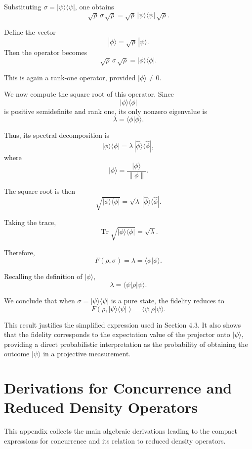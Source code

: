 \documentclass[a4paper]{article}
\begin{document}
Substituting $\sigma = |\psi\rangle\langle\psi|$, one obtains
\[
\sqrt{\rho}\,\sigma\,\sqrt{\rho}
=
\sqrt{\rho}\,|\psi\rangle\langle\psi|\,\sqrt{\rho}.
\]

Define the vector
\[
|\phi\rangle = \sqrt{\rho}\,|\psi\rangle.
\]
Then the operator becomes
\[
\sqrt{\rho}\,\sigma\,\sqrt{\rho}
=
|\phi\rangle\langle\phi|.
\]

This is again a rank-one operator, provided $|\phi\rangle \neq 0$.

\medskip

We now compute the square root of this operator. Since
\[
|\phi\rangle\langle\phi|
\]
is positive semidefinite and rank one, its only nonzero eigenvalue is
\[
\lambda = \langle \phi | \phi \rangle.
\]

Thus, its spectral decomposition is
\[
|\phi\rangle\langle\phi|
=
\lambda\,|\hat{\phi}\rangle\langle\hat{\phi}|,
\]
where
\[
|\hat{\phi}\rangle = \frac{|\phi\rangle}{\|\phi\|}.
\]

The square root is then
\[
\sqrt{|\phi\rangle\langle\phi|}
=
\sqrt{\lambda}\,|\hat{\phi}\rangle\langle\hat{\phi}|.
\]

Taking the trace,
\[
\operatorname{Tr}\sqrt{|\phi\rangle\langle\phi|}
=
\sqrt{\lambda}.
\]

Therefore,
\[
F(\rho,\sigma)
=
\lambda
=
\langle \phi | \phi \rangle.
\]

Recalling the definition of $|\phi\rangle$,
\[
\lambda
=
\langle \psi | \rho | \psi \rangle.
\]

\medskip

We conclude that when $\sigma = |\psi\rangle\langle\psi|$ is a pure state, the fidelity reduces to
\[
F(\rho,|\psi\rangle\langle\psi|)
=
\langle \psi | \rho | \psi \rangle.
\]

\medskip

This result justifies the simplified expression used in Section 4.3. It also shows that the fidelity corresponds to the expectation value of the projector onto $|\psi\rangle$, providing a direct probabilistic interpretation as the probability of obtaining the outcome $|\psi\rangle$ in a projective measurement.
\section{Derivations for Concurrence and Reduced Density Operators}

This appendix collects the main algebraic derivations leading to the compact expressions for concurrence and its relation to reduced density operators.
\end{document}
